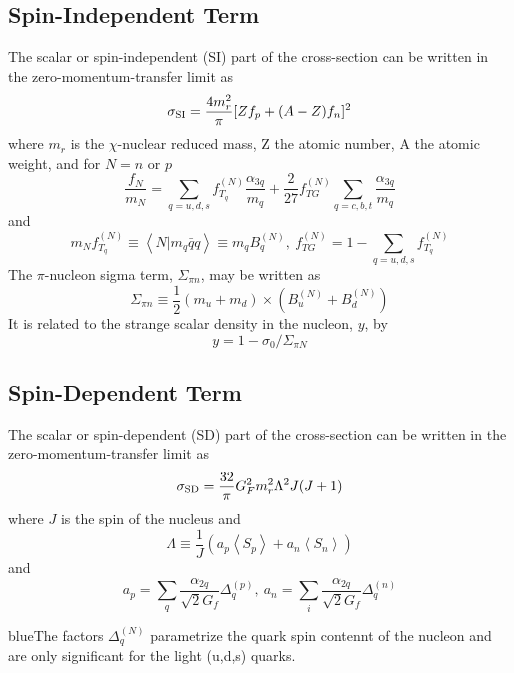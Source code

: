 \subsection{Spin-Independent Term}
The scalar or spin-independent (SI) part of the cross-section can be written in the zero-momentum-transfer limit as
\begin{equation}
\sigma_{\rm SI} = \frac{4m_r^2}{\pi}[Zf_p + (A-Z)f_n]^2
\label{eq:SSI}
\end{equation}
where $m_r$ is the $\chi$-nuclear reduced mass, Z the atomic number, A the atomic weight, and for $N = n$ or $p$
\begin{equation}
\frac{f_N}{m_N} = \sum_{q=u,d,s} f_{T_q}^{(N)} \frac{\alpha_{3q}}{m_q} + \frac{2}{27}f_{TG}^{(N)}\sum_{q=c,b,t}\frac{\alpha_{3q}}{m_q}
\end{equation}
and 
\begin{equation}
m_Nf_{T_q}^{(N)} \equiv \left \langle N|m_q\bar{q}q \right \rangle \equiv m_q B_q^{(N)}, \ f_{TG}^{(N)} = 1 - \sum_{q=u,d,s}f_{T_q}^{(N)}
\end{equation}
The $\pi$-nucleon sigma term, $\Sigma_{\pi n}$, may be written as 
\begin{equation}
\Sigma_{\pi n} \equiv \frac{1}{2}(m_u + m_d)\times(B_u^{(N)}+B_d^{(N)})
\end{equation}
It is related to the strange scalar density in the nucleon, $y$, by
\begin{equation}
y = 1 - \sigma_0/\Sigma_{\pi N}
\end{equation}

\subsection{Spin-Dependent Term}
The scalar or spin-dependent (SD) part of the cross-section can be written in the zero-momentum-transfer limit as
\begin{equation}
\sigma_{\rm SD} = \frac{32}{\pi}G_F^2m_r^2\Lambda^2J(J+1)
\label{eq:SSD}
\end{equation}
where $J$ is the spin of the nucleus and 
\begin{equation}
\Lambda \equiv \frac{1}{J}(a_p\left \langle S_p \right \rangle + a_n\left \langle S_n \right \rangle)
\end{equation}
and
\begin{equation}
a_p = \sum_q \frac{\alpha_{2q}}{\sqrt{2}G_f}\Delta_q^{(p)},\ a_n = \sum_i \frac{\alpha_{2q}}{\sqrt{2}G_f}\Delta_q^{(n)}
\end{equation}
\begin{textcolor}{blue}{The factors $\Delta_q^{(N)}$ parametrize the quark spin contennt of the nucleon and are only significant for the light (u,d,s) quarks.}\end{textcolor}

